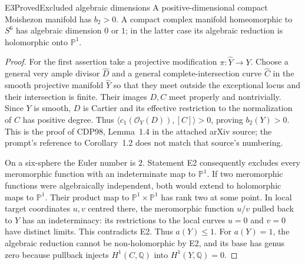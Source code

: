 \begin{statement}{E3}{Proved}{Excluded algebraic dimensions}
A positive-dimensional compact Moishezon manifold has $b_2>0$.
A compact complex manifold homeomorphic to $S^6$ has algebraic
dimension $0$ or $1$; in the latter case its algebraic reduction is
holomorphic onto $\mathbb P^1$.
\end{statement}
\begin{proof}
For the first assertion take a projective modification
$\pi:\widehat Y\to Y$. Choose a general very ample divisor
$\widehat D$ and a general complete-intersection curve
$\widehat C$ in the smooth projective manifold $\widehat Y$ so that
they meet outside the exceptional locus and their intersection is
finite. Their images $D,C$ meet properly and nontrivially. Since $Y$
is smooth, $D$ is Cartier and its effective restriction to the
normalization of $C$ has positive degree. Thus
$\langle c_1(\mathcal O_Y(D)),[C]\rangle>0$, proving $b_2(Y)>0$.
This is the proof of CDP98, Lemma~1.4 in the attached arXiv source;
the prompt's reference to Corollary~1.2 does not match that source's
numbering.

On a six-sphere the Euler number is $2$. Statement E2 consequently
excludes every meromorphic function with an indeterminate map to
$\mathbb P^1$. If two meromorphic functions were algebraically
independent, both would extend to holomorphic maps to
$\mathbb P^1$. Their product map to $\mathbb P^1\times\mathbb P^1$
has rank two at some point. In local target coordinates $u,v$
centred there, the meromorphic function $u/v$ pulled back to $Y$
has an indeterminacy: its restrictions to the local curves
$u=0$ and $v=0$ have distinct limits. This contradicts E2.
Thus $a(Y)\leq1$. For $a(Y)=1$, the algebraic reduction cannot be
non-holomorphic by E2, and its base has genus zero because pullback
injects $H^1(C,\mathbb Q)$ into $H^1(Y,\mathbb Q)=0$.
\end{proof}

